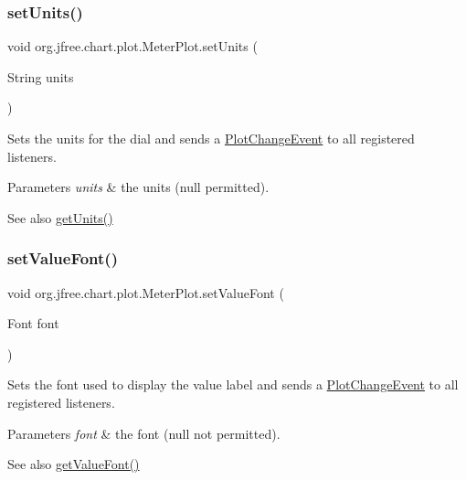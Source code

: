 \subsubsection{\texorpdfstring{set\+Units()}{setUnits()}}
{\footnotesize\ttfamily void org.\+jfree.\+chart.\+plot.\+Meter\+Plot.\+set\+Units (\begin{DoxyParamCaption}\item[{String}]{units }\end{DoxyParamCaption})}

Sets the units for the dial and sends a \mbox{\hyperlink{}{Plot\+Change\+Event}} to all registered listeners.


\begin{DoxyParams}{Parameters}
{\em units} & the units ({\ttfamily null} permitted).\\
\hline
\end{DoxyParams}
\begin{DoxySeeAlso}{See also}
\mbox{\hyperlink{classorg_1_1jfree_1_1chart_1_1plot_1_1_meter_plot_a905469866f0465792ee58a17a9eb221a}{get\+Units()}} 
\end{DoxySeeAlso}
\mbox{\label{classorg_1_1jfree_1_1chart_1_1plot_1_1_meter_plot_a12feccbac31a09ab9512c424f38bdef4}} 
\subsubsection{\texorpdfstring{set\+Value\+Font()}{setValueFont()}}
{\footnotesize\ttfamily void org.\+jfree.\+chart.\+plot.\+Meter\+Plot.\+set\+Value\+Font (\begin{DoxyParamCaption}\item[{Font}]{font }\end{DoxyParamCaption})}

Sets the font used to display the value label and sends a \mbox{\hyperlink{}{Plot\+Change\+Event}} to all registered listeners.


\begin{DoxyParams}{Parameters}
{\em font} & the font ({\ttfamily null} not permitted).\\
\hline
\end{DoxyParams}
\begin{DoxySeeAlso}{See also}
\mbox{\hyperlink{classorg_1_1jfree_1_1chart_1_1plot_1_1_meter_plot_a12d73d067c872a15f1514c43b642c774}{get\+Value\+Font()}} 
\end{DoxySeeAlso}
\mbox{\label{classorg_1_1jfree_1_1chart_1_1plot_1_1_meter_plot_a35b5c4f95211a811e7efc9e2015d0886}} 
